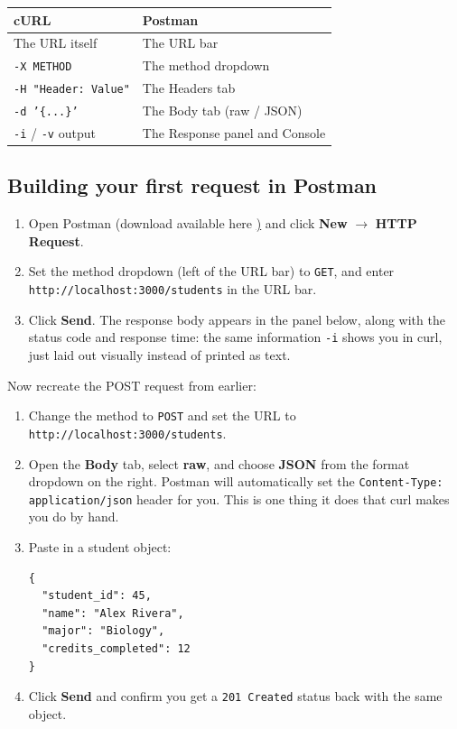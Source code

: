 \begin{table}[]
  \begin{tabular}{|l|l|}
    \hline
    \textbf{cURL}                         & \textbf{Postman}                 \\ \hline
    The URL itself                        & The URL bar                      \\ \hline
    \texttt{-X METHOD}                    & The method dropdown               \\ \hline
    \texttt{-H "Header: Value"}           & The Headers tab                   \\ \hline
    \texttt{-d '\{...\}'}                 & The Body tab (raw / JSON)         \\ \hline
    \texttt{-i} / \texttt{-v} output      & The Response panel and Console    \\ \hline
  \end{tabular}
\end{table}
 
\subsection{Building your first request in Postman}
 
\begin{enumerate}
  \item Open Postman (download available here \href{https://www.postman.com/}) and click \textbf{New} $\rightarrow$
        \textbf{HTTP Request}.
  \item Set the method dropdown (left of the URL bar) to \texttt{GET},
        and enter \texttt{http://localhost:3000/students} in the URL bar.
  \item Click \textbf{Send}. The response body appears in the panel
        below, along with the status code and response time: the same
        information \texttt{-i} shows you in curl, just laid out visually
        instead of printed as text.
\end{enumerate}
 
Now recreate the POST request from earlier:
 
\begin{enumerate}
  \item Change the method to \texttt{POST} and set the URL to
        \texttt{http://localhost:3000/students}.
  \item Open the \textbf{Body} tab, select \textbf{raw}, and choose
        \textbf{JSON} from the format dropdown on the right. Postman will
        automatically set the \texttt{Content-Type: application/json}
        header for you. This is one thing it does that curl makes you
        do by hand.
  \item Paste in a student object:
        \begin{verbatim}
{
  "student_id": 45,
  "name": "Alex Rivera",
  "major": "Biology",
  "credits_completed": 12
}
        \end{verbatim}
  \item Click \textbf{Send} and confirm you get a
        \texttt{201 Created} status back with the same object.
\end{enumerate}
 
